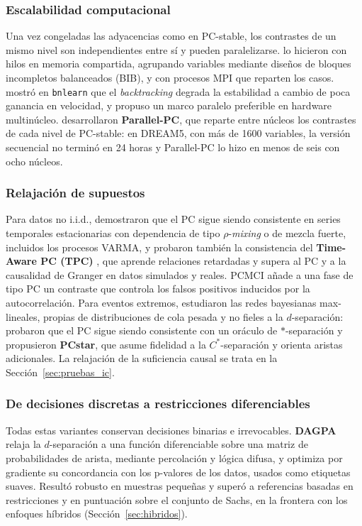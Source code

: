 \subsubsection{Escalabilidad computacional}
Una vez congeladas las adyacencias como en PC-stable, los contrastes de un mismo nivel son independientes entre sí y pueden paralelizarse. \citet{madsen2017parallel} lo hicieron con hilos en memoria compartida, agrupando variables mediante diseños de bloques incompletos balanceados (BIB), y con procesos MPI que reparten los casos. \citet{scutari2017bayesian} mostró en \texttt{bnlearn} que el \emph{backtracking} degrada la estabilidad a cambio de poca ganancia en velocidad, y propuso un marco paralelo preferible en hardware multinúcleo. \citet{le2016fast} desarrollaron \textbf{Parallel-PC}, que reparte entre núcleos los contrastes de cada nivel de PC-stable: en DREAM5, con más de 1600 variables, la versión secuencial no terminó en 24 horas y Parallel-PC lo hizo en menos de seis con ocho núcleos.

\subsubsection{Relajación de supuestos}
Para datos no i.i.d., \citet{biswas2024consistent} demostraron que el PC sigue siendo consistente en series temporales estacionarias con dependencia de tipo $\rho$-\emph{mixing} o de mezcla fuerte, incluidos los procesos VARMA, y probaron también la consistencia del \textbf{Time-Aware PC (TPC)} \citep{biswas2022timeaware}, que aprende relaciones retardadas y supera al PC y a la causalidad de Granger en datos simulados y reales. PCMCI \citep{runge2019detecting} añade a una fase de tipo PC un contraste que controla los falsos positivos inducidos por la autocorrelación. Para eventos extremos, \citet{Amendola2026PCstar} estudiaron las redes bayesianas max-lineales, propias de distribuciones de cola pesada y no fieles a la $d$-separación: probaron que el PC sigue siendo consistente con un oráculo de $\ast$-separación y propusieron \textbf{PCstar}, que asume fidelidad a la $C^\ast$-separación y orienta aristas adicionales. La relajación de la suficiencia causal se trata en la Sección~\ref{sec:pruebas_ic}.

\subsubsection{De decisiones discretas a restricciones diferenciables}
Todas estas variantes conservan decisiones binarias e irrevocables. \textbf{DAGPA} \citep{zhou2025differentiable} relaja la $d$-separación a una función diferenciable sobre una matriz de probabilidades de arista, mediante percolación y lógica difusa, y optimiza por gradiente su concordancia con los p-valores de los datos, usados como etiquetas suaves. Resultó robusto en muestras pequeñas y superó a referencias basadas en restricciones y en puntuación sobre el conjunto de Sachs, en la frontera con los enfoques híbridos (Sección~\ref{sec:hibridos}).

